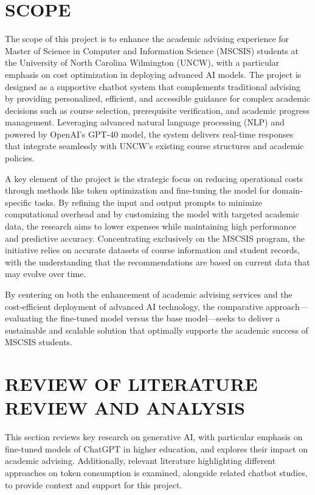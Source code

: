 \documentclass[12pt,oneside,openany]{report}
\begin{document}
\chapter{SCOPE}
The scope of this project is to enhance the academic advising experience for Master of Science in Computer and Information Science (MSCSIS) students at the University of North Carolina Wilmington (UNCW), with a particular emphasis on cost optimization in deploying advanced AI models. The project is designed as a supportive chatbot system that complements traditional advising by providing personalized, efficient, and accessible guidance for complex academic decisions such as course selection, prerequisite verification, and academic progress management. Leveraging advanced natural language processing (NLP) and powered by OpenAI's GPT-40 model, the system delivers real-time responses that integrate seamlessly with UNCW's existing course structures and academic policies.

A key element of the project is the strategic focus on reducing operational costs through methods like token optimization and fine-tuning the model for domain-specific tasks. By refining the input and output prompts to minimize computational overhead and by customizing the model with targeted academic data, the research aims to lower expenses while maintaining high performance and predictive accuracy. Concentrating exclusively on the MSCSIS program, the initiative relies on accurate datasets of course information and student records, with the understanding that the recommendations are based on current data that may evolve over time.

By centering on both the enhancement of academic advising services and the cost-efficient deployment of advanced AI technology, the comparative approach—evaluating the fine-tuned model versus the base model—seeks to deliver a sustainable and scalable solution that optimally supports the academic success of MSCSIS students.

\chapter{REVIEW OF LITERATURE REVIEW AND ANALYSIS}

This section reviews key research on generative AI, with particular emphasis on fine-tuned models of ChatGPT in higher education, and explores their impact on academic advising. Additionally, relevant literature highlighting different approaches on token consumption is examined, alongside related chatbot studies, to provide context and support for this project.
\end{document}
